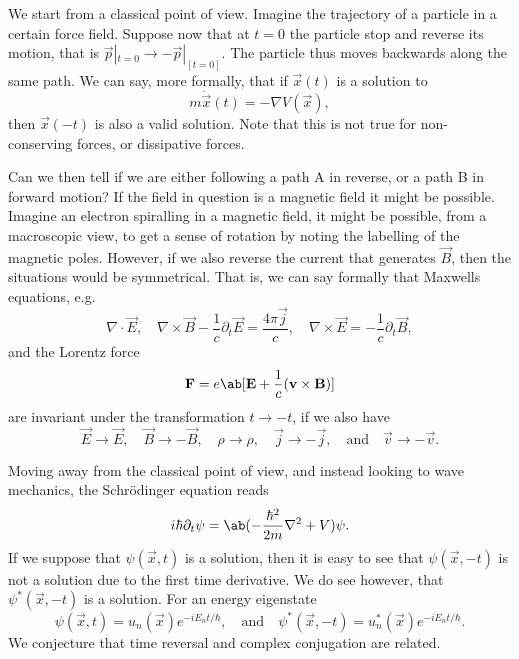 We start from a classical point of view. Imagine the trajectory of a particle in a certain force field. Suppose now that at $t=0$ the particle stop and reverse its motion, that is $\vec{p}|_{t=0} \to -\vec{p}|_[t=0]$. The particle thus moves backwards along the same path. We can say, more formally, that if $\vec{x}(t)$ is a solution to
\begin{equation}
    m\ddot{\vec{x}}(t) = -\nabla V(\vec{x}),
\end{equation}
then $\vec{x}(-t)$ is also a valid solution. Note that this is not true for non-conserving forces, or dissipative forces.

Can we then tell if we are either following a path A in reverse, or a path B in forward motion? If the field in question is a magnetic field it might be possible. Imagine an electron spiralling in a magnetic field, it might be possible, from a macroscopic view, to get a sense of rotation by noting the labelling of the magnetic poles. However, if we also reverse the current that generates $\vec{B}$, then the situations would be symmetrical. That is, we can say formally that Maxwells equations, e.g.
\begin{equation}
    \nabla \cdot \vec{E}, \quad \nabla\times\vec{B} - \frac{1}{c} \partial_t \vec{E}=\frac{4\pi\vec{j}}{c}, \quad \nabla\times\vec{E} = -\frac{1}{c}\partial_t\vec{B},
\end{equation}
and the Lorentz force 
\begin{equation}
    \vec{F} = e \ab[\vec{E} + \frac{1}{c}(\vec{v}\times\vec{B})]
\end{equation}
are invariant under the transformation $t\to -t$, if we also have 
\begin{equation}
    \vec{E}\to \vec{E}, \quad \vec{B}\to -\vec{B}, \quad \rho \to \rho, \quad \vec{j} \to -\vec{j}, \quad\text{and}\quad \vec{v}\to -\vec{v}.
\end{equation}

Moving away from the classical point of view, and instead looking to wave mechanics, the Schrödinger equation reads
\begin{equation}
    i\hbar \partial_t \psi = \ab(-\frac{\hbar^2}{2m}\nabla^2 + V)\psi.
\end{equation}
If we suppose that $\psi(\vec{x}, t)$ is a solution, then it is easy to see that $\psi(\vec{x}, -t)$ is not a solution due to the first time derivative. We do see however, that $\psi^*(\vec{x}, -t)$ is a solution. For an energy eigenstate
\begin{equation}
    \psi(\vec{x}, t) = u_n(\vec{x}) e^{-iE_n t/\hbar}, \quad\text{and}\quad \psi^*(\vec{x}, -t) = u_n^*(\vec{x}) e^{-iE_n t/\hbar}.
\end{equation}
We conjecture that time reversal and complex conjugation are related. 

